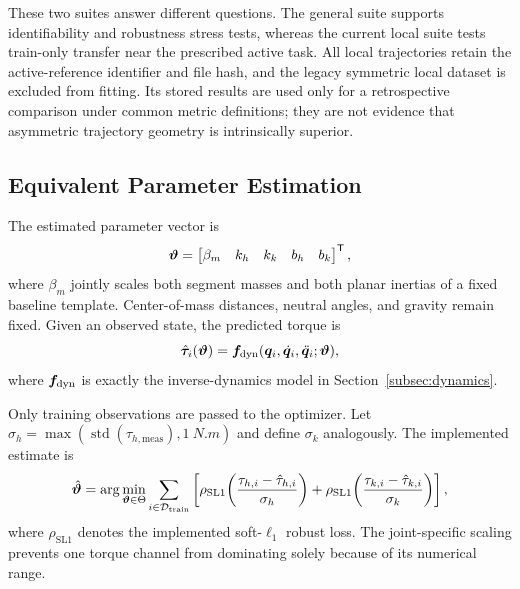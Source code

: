 These two suites answer different questions.  The general suite supports
identifiability and robustness stress tests, whereas the current local suite
tests train-only transfer near the prescribed active task.  All local
trajectories retain the active-reference identifier and file hash, and the
legacy symmetric local dataset is excluded from fitting.  Its stored results
are used only for a retrospective comparison under common metric definitions;
they are not evidence that asymmetric trajectory geometry is intrinsically
superior.

\subsection{Equivalent Parameter Estimation}
\label{subsec:parameter_estimation}

The estimated parameter vector is
\begin{equation}
    \bm{\vartheta}=
    \begin{bmatrix}
    \beta_m & k_h & k_k & b_h & b_k
    \end{bmatrix}^{\mathsf T},
    \label{eq:parameter_vector}
\end{equation}
where $\beta_m$ jointly scales both segment masses and both planar inertias of
a fixed baseline template.  Center-of-mass distances, neutral angles, and
gravity remain fixed.  Given an observed state, the predicted torque is
\begin{equation}
    \hat{\bm{\tau}}_i(\bm{\vartheta})
    =\bm{f}_{\mathrm{dyn}}
    (\bm{q}_i,\dot{\bm{q}}_i,\ddot{\bm{q}}_i;
     \bm{\vartheta}),
    \label{eq:torque_prediction}
\end{equation}
where $\bm{f}_{\mathrm{dyn}}$ is exactly the inverse-dynamics model in
Section~\ref{subsec:dynamics}.

Only training observations are passed to the optimizer.  Let
$\sigma_h=\max(\operatorname{std}(\tau_{h,\mathrm{meas}}),
\SI{1}{N.m})$ and define $\sigma_k$ analogously.  The implemented estimate is
\begin{equation}
    \hat{\bm{\vartheta}}
    =\arg\min_{\bm{\vartheta}\in\Theta}
    \sum_{i\in\mathcal{D}_{\mathrm{train}}}
    \left[
    \rho_{\mathrm{SL1}}\!\left(
      \frac{\tau_{h,i}-\hat\tau_{h,i}}{\sigma_h}
    \right)
    +
    \rho_{\mathrm{SL1}}\!\left(
      \frac{\tau_{k,i}-\hat\tau_{k,i}}{\sigma_k}
    \right)
    \right],
    \label{eq:estimation_objective}
\end{equation}
where $\rho_{\mathrm{SL1}}$ denotes the implemented soft-$\ell_1$ robust loss.
The joint-specific scaling prevents one torque channel from dominating solely
because of its numerical range.

